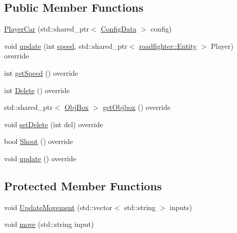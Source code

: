 \subsection*{Public Member Functions}
\begin{DoxyCompactItemize}
\item 
\hyperlink{classroadfighter_1_1PlayerCar_a9e0ee387eaede6b742174877c1d594d4}{Player\+Car} (std\+::shared\+\_\+ptr$<$ \hyperlink{classConfigData}{Config\+Data} $>$ config)
\item 
void \hyperlink{classroadfighter_1_1PlayerCar_a65daed6d30d8b65f368779eaa43714e2}{update} (int \hyperlink{classroadfighter_1_1PlayerCar_a0e6307f59c765c9b88ec2b1f0f8f07fc}{speed}, std\+::shared\+\_\+ptr$<$ \hyperlink{classroadfighter_1_1Entity}{roadfighter\+::\+Entity} $>$ Player) override
\item 
int \hyperlink{classroadfighter_1_1PlayerCar_a642a825b604a407ae4711bdafd054b22}{get\+Speed} () override
\item 
int \hyperlink{classroadfighter_1_1PlayerCar_a1c4a181eee7a89315680eca4892ebc32}{Delete} () override
\item 
std\+::shared\+\_\+ptr$<$ \hyperlink{structObjBox}{Obj\+Box} $>$ \hyperlink{classroadfighter_1_1PlayerCar_ac0b95a6ef2829905ad4717a52b7cb5eb}{get\+Objbox} () override
\item 
void \hyperlink{classroadfighter_1_1PlayerCar_a24401332a8585b0fcfbfd33df93021e0}{set\+Delete} (int del) override
\item 
bool \hyperlink{classroadfighter_1_1PlayerCar_af9e034824497fb287085be08c3995733}{Shoot} () override
\item 
void \hyperlink{classroadfighter_1_1PlayerCar_a47772fa1d9fcdba69f288112d5359acd}{update} () override
\end{DoxyCompactItemize}
\subsection*{Protected Member Functions}
\begin{DoxyCompactItemize}
\item 
void \hyperlink{classroadfighter_1_1PlayerCar_a2aa6cf43ac6cf7834d1f854d33fc5e0d}{Update\+Movement} (std\+::vector$<$ std\+::string $>$ inputs)
\item 
void \hyperlink{classroadfighter_1_1PlayerCar_af6a39916181bce4cab033d0b4370cfba}{move} (std\+::string input)
\end{DoxyCompactItemize}
